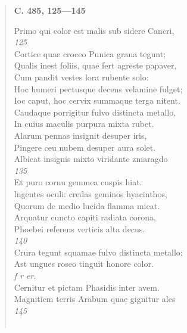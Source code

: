 \documentclass[11pt, a4paper]{report}
\begin{document}
\begin{verse}
     \marginpar{[26]} \begin{center} \textbf{C. 485, 125—145} \end{center}Primo qui color est malis sub sidere Cancri, \\ \textit{125} \\ Cortice quae croceo Punica grana tegunt; \\ Qualis inest foliis, quae fert agreste papaver, \\ Cum pandit vestes lora rubente solo: \\ Hoc humeri pectusque decens velamine fulget; \\ Ioc caput, hoc cervix summaque terga nitent. \\ Caudaque porrigitur fulvo distincta metallo, \\ In cuius maculis purpura mixta rubet. \\ Alarum pennas insignit desuper iris, \\ Pingere ceu nubem desuper aura solet. \\ Albicat insignis mixto viridante zmaragdo \\ \textit{135} \\ Et puro cornu gemmea cuspis hiat. \\ lngentes oculi: credas geminos hyacinthos, \\ Quorum de medio lucida flamma micat. \\ Arquatur cuncto capiti radiata corona, \\ Phoebei referens verticis alta decus. \\ \textit{140} \\ Crura tegunt squamae fulvo distincta metallo; \\ Ast ungues roseo tinguit honore color. \\ \textit{f r er.} \\ Cernitur et pictam Phasidis inter avem. \\ Magnitiem terris Arabum quae gignitur ales \\ \textit{145} \\ 
        ﻿\pagebreak 

\end{verse}
\end{document}
